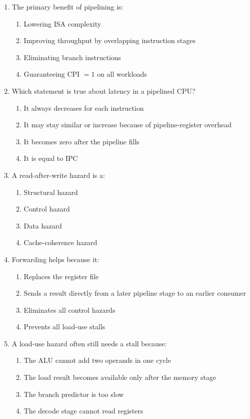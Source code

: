\documentclass[11pt]{article}
\begin{document}
\begin{enumerate}[label=\textbf{A\arabic*.}]
  \item The primary benefit of pipelining is:
  \begin{enumerate}[label=(\Alph*)]
    \item Lowering ISA complexity
    \item Improving throughput by overlapping instruction stages
    \item Eliminating branch instructions
    \item Guaranteeing CPI \(= 1\) on all workloads
  \end{enumerate}

  \item Which statement is true about latency in a pipelined CPU?
  \begin{enumerate}[label=(\Alph*)]
    \item It always decreases for each instruction
    \item It may stay similar or increase because of pipeline-register overhead
    \item It becomes zero after the pipeline fills
    \item It is equal to IPC
  \end{enumerate}

  \item A read-after-write hazard is a:
  \begin{enumerate}[label=(\Alph*)]
    \item Structural hazard
    \item Control hazard
    \item Data hazard
    \item Cache-coherence hazard
  \end{enumerate}

  \item Forwarding helps because it:
  \begin{enumerate}[label=(\Alph*)]
    \item Replaces the register file
    \item Sends a result directly from a later pipeline stage to an earlier consumer
    \item Eliminates all control hazards
    \item Prevents all load-use stalls
  \end{enumerate}

  \item A load-use hazard often still needs a stall because:
  \begin{enumerate}[label=(\Alph*)]
    \item The ALU cannot add two operands in one cycle
    \item The load result becomes available only after the memory stage
    \item The branch predictor is too slow
    \item The decode stage cannot read registers
  \end{enumerate}


\end{enumerate}
\end{document}
